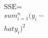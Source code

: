 \documentclass[preview]{standalone}
\begin{document}
\begin{align*}
\text{SSE} = \\sum_{i=1}^{n} (y_i - \\hat{y}_i)^2
\end{align*}
\end{document}
